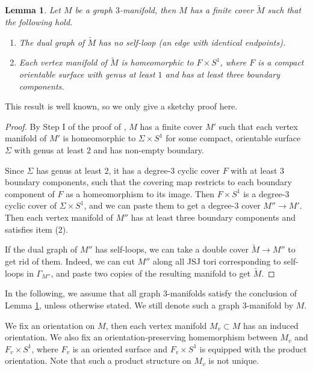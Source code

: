 \documentclass{amsart}
\numberwithin{equation}{section}
\newtheorem{lemma}[theorem]{Lemma}
\theoremstyle{definition}
\begin{document}
\begin{lemma}\label{simplegraph}
Let $M$ be a graph $3$-manifold, then $M$ has a finite cover $\tilde{M}$ such that the following hold.
\begin{enumerate}
\item The dual graph of $\tilde{M}$ has no self-loop (an edge with identical endpoints). 
\item Each vertex manifold of $\tilde{M}$ is homeomorphic to $F\times S^1$, where $F$ is a compact orientable surface with genus at least $1$ and has at least three boundary components.
\end{enumerate}
\end{lemma}
This result is well known, so we only give a sketchy proof here.

\begin{proof}
By Step I of the proof of \cite[Proposition 5.1]{SW}, $M$ has a finite cover $M'$ such that each vertex manifold of $M'$ is homeomorphic to $\Sigma\times S^1$ for some compact, orientable surface $\Sigma$ with genus at least $2$ and has non-empty boundary.

Since $\Sigma$ has genus at least $2$, it has a degree-$3$ cyclic cover $F$ with at least $3$ boundary components, such that the covering map restricts to each boundary component of $F$ as a homeomorphism to its image. Then $F\times S^1$ is a degree-$3$ cyclic cover of $\Sigma\times S^1$, and we can paste them to get a degree-$3$ cover $M''\to M'$. Then each vertex manifold of $M''$ has at least three boundary components and satisfies item (2).

If the dual graph of $M''$ has self-loops, we can take a double cover $\tilde{M}\to M''$ to get rid of them. Indeed, we can cut $M''$ along all JSJ tori corresponding to self-loops in $\Gamma_{M''}$, and paste two copies of the resulting manifold to get $\tilde{M}$.
\end{proof}



In the following, we assume that all graph $3$-manifolds satisfy the conclusion of Lemma \ref{simplegraph}, unless otherwise stated. We still denote such a graph $3$-manifold by $M$. 


We fix an orientation on $M$, then each vertex manifold $M_v\subset M$ has an induced orientation. We also fix an orientation-preserving homemorphism between $M_v$ and $F_v\times S^1$, where $F_v$ is an oriented surface and $F_v\times S^1$ is equipped with the product orientation. Note that such a product structure on $M_v$ is not unique. 
\end{document}
